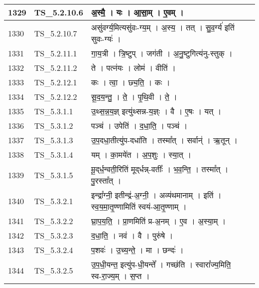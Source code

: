 \documentclass[17pt]{extarticle}
\begin{document}
\begin{longtable}{||p{0.4in}||p{0.9in}||p{4.0in}||p{0.9in}||}
        \hline
            1329 & TS\_5.2.10.6 & अ॒स्मै॒   ।   यः   ।   आ॒सा॒म्   ।   ए॒वम्   ।    &      \\
        \hline
            1330 & TS\_5.2.10.7 & असु॑वर्ग्य॒मित्यसु॑वः{-}ग्य॒म्   ।   अ॒स्य॒   ।   तत्   ।   सु॒व॒र्ग्य॑ इति॑ सुवः{-}ग्यः॑   ।    &      \\
        \hline
            1331 & TS\_5.2.11.1 & गा॒य॒त्री   ।   त्रि॒ष्टुप्   ।   जग॑ती   ।   अ॒नु॒ष्टुगित्य॑नु{-}स्तुक्   ।    &      \\
        \hline
            1332 & TS\_5.2.11.2 & ते   ।   पत्न॑यः   ।   लोम॑   ।   वीति॑   ।    &      \\
        \hline
            1333 & TS\_5.2.12.1 & कः   ।   त्वा॒   ।   छ्य॒ति॒   ।   कः   ।    &      \\
        \hline
            1334 & TS\_5.2.12.2 & सू॒द॒य॒न्तु॒   ।   ते॒   ।   पृ॒थि॒वी   ।   ते॒   ।    &      \\
        \hline
            1335 & TS\_5.3.1.1 & उ॒थ्स॒न्न॒य॒ज्ञ् इत्यु॑थ्सन्न{-}य॒ज्ञ्ः   ।   वै   ।   ए॒षः   ।   यत्   ।    &      \\
        \hline
            1336 & TS\_5.3.1.2 & पञ्च॑   ।   उपेति॑   ।   द॒धा॒ति॒   ।   पञ्च॑   ।    &      \\
        \hline
            1337 & TS\_5.3.1.3 & उ॒प॒दधा॒तीत्यु॑प{-}दधा॑ति   ।   तस्मा᳚त्   ।   सर्वान्॑   ।   ऋ॒तून्   ।    &      \\
        \hline
            1338 & TS\_5.3.1.4 & यम्   ।   का॒मये॑त   ।   अ॒प॒शुः   ।   स्या॒त्   ।    &      \\
        \hline
            1339 & TS\_5.3.1.5 & मू॒द्‌र्ध॒न्वती॒रिति॑ मूद्‌र्धन्न्{-}वतीः᳚   ।   भ॒व॒न्ति॒   ।   तस्मा᳚त्   ।   पु॒रस्ता᳚त्   ।    &      \\
        \hline
            1340 & TS\_5.3.2.1 & इन्द्रा᳚ग्नी॒ इतीन्द्र॑{-}अ॒ग्नी॒   ।   अव्य॑थमानाम्   ।   इति॑   ।   स्व॒य॒मा॒तृ॒ण्णामिति॑ स्वयं{-}आ॒तृ॒ण्णाम्   ।    &      \\
        \hline
            1341 & TS\_5.3.2.2 & घ्रा॒प॒य॒ति॒   ।   प्रा॒णमिति॑ प्र{-}अ॒नम्   ।   ए॒व   ।   अ॒स्या॒म्   ।    &      \\
        \hline
            1342 & TS\_5.3.2.3 & द॒धा॒ति॒   ।   नव॑   ।   वै   ।   पुरु॑षे   ।    &      \\
        \hline
            1343 & TS\_5.3.2.4 & प॒शवः॑   ।   उ॒च्य॒न्ते॒   ।   मा   ।   छन्दः॑   ।    &      \\
        \hline
            1344 & TS\_5.3.2.5 & उ॒प॒धी॒यन्त॒ इत्यु॑प{-}धी॒यन्ते᳚   ।   गच्छ॑ति   ।   स्वारा᳚ज्य॒मिति॒ स्व{-}रा॒ज्य॒म्   ।   स॒प्त   ।    &      \\

\end{longtable}
\end{document}
